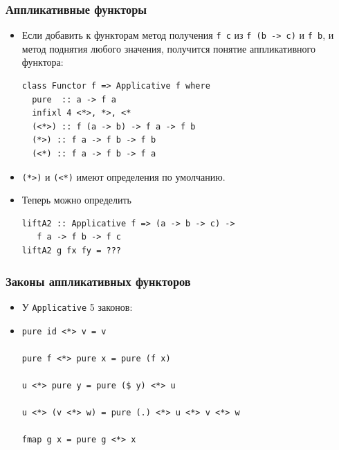 \documentclass[11pt]{beamer}
\begin{document}
\begin{frame}[fragile]
  \frametitle{Аппликативные функторы}
  \begin{itemize}
    \item Если добавить к функторам метод получения \lstinline|f c| из \lstinline|f (b -> c)| и \lstinline|f b|, и метод поднятия любого значения, получится понятие аппликативного функтора:
          \begin{lstlisting}[basicstyle=\ttfamily\small]
class Functor f => Applicative f where
  pure  :: a -> f a
  infixl 4 <*>, *>, <*
  (<*>) :: f (a -> b) -> f a -> f b
  (*>) :: f a -> f b -> f b
  (<*) :: f a -> f b -> f a
\end{lstlisting}
    \item \lstinline|(*>)| и \lstinline|(<*)| имеют определения по умолчанию.
    \item Теперь можно определить
          \begin{lstlisting}[basicstyle=\ttfamily\small]
liftA2 :: Applicative f => (a -> b -> c) -> 
   f a -> f b -> f c
liftA2 g fx fy = ???
\end{lstlisting}
  \end{itemize}
\end{frame}

\begin{frame}[fragile]
  \frametitle{Законы аппликативных функторов}
  \begin{itemize}
    \item У \lstinline|Applicative| 5 законов:
    \item
          \begin{lstlisting}
pure id <*> v = v

pure f <*> pure x = pure (f x)

u <*> pure y = pure ($ y) <*> u

u <*> (v <*> w) = pure (.) <*> u <*> v <*> w

fmap g x = pure g <*> x
\end{lstlisting}
  \end{itemize}
\end{frame}
\end{document}
